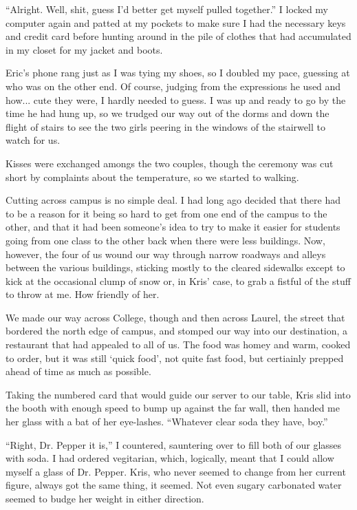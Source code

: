 ``Alright.  Well, shit, guess I'd better get myself pulled together.''  I locked my computer again and patted at my pockets to make sure I had the necessary keys and credit card before hunting around in the pile of clothes that had accumulated in my closet for my jacket and boots.

Eric's phone rang just as I was tying my shoes, so I doubled my pace, guessing at who was on the other end.  Of course, judging from the expressions he used and how... cute they were, I hardly needed to guess.  I was up and ready to go by the time he had hung up, so we trudged our way out of the dorms and down the flight of stairs to see the two girls peering in the windows of the stairwell to watch for us.

Kisses were exchanged amongs the two couples, though the ceremony was cut short by complaints about the temperature, so we started to walking.

Cutting across campus is no simple deal.  I had long ago decided that there had to be a reason for it being so hard to get from one end of the campus to the other, and that it had been someone's idea to try to make it easier for students going from one class to the other back when there were less buildings.  Now, however, the four of us wound our way through narrow roadways and alleys between the various buildings, sticking mostly to the cleared sidewalks except to kick at the occasional clump of snow or, in Kris' case, to grab a fistful of the stuff to throw at me.  How friendly of her.

We made our way across College, though and then across Laurel, the street that bordered the north edge of campus, and stomped our way into our destination, a restaurant that had appealed to all of us.  The food was homey and warm, cooked to order, but it was still `quick food', not quite fast food, but certiainly prepped ahead of time as much as possible.

Taking the numbered card that would guide our server to our table, Kris slid into the booth with enough speed to bump up against the far wall, then handed me her glass with a bat of her eye-lashes.  ``Whatever clear soda they have, boy.''

``Right, Dr. Pepper it is,'' I countered, sauntering over to fill both of our glasses with soda.  I had ordered vegitarian, which, logically, meant that I could allow myself a glass of Dr. Pepper.  Kris, who never seemed to change from her current figure, always got the same thing, it seemed.  Not even sugary carbonated water seemed to budge her weight in either direction.

